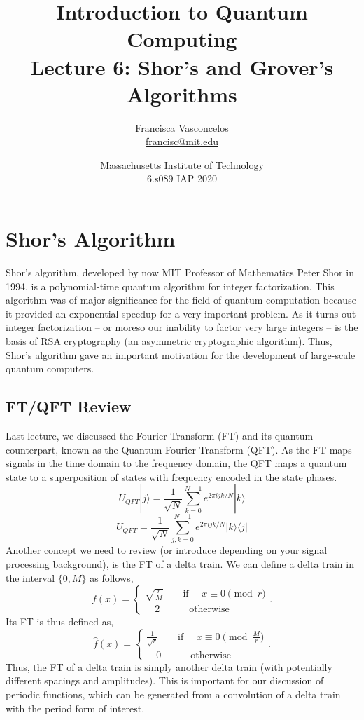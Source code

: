 \documentclass[11pt]{article} %
\author{Francisca Vasconcelos\\\href{mailto:francisc@mit.edu} {francisc@mit.edu}}
\title{Introduction to Quantum Computing\\Lecture 6: Shor's and Grover's Algorithms}
\date{Massachusetts Institute of Technology\\6.s089 IAP 2020}
\begin{document}
\maketitle
\newpage
\tableofcontents
\newpage

\section{Shor's Algorithm}
Shor's algorithm, developed by now MIT Professor of Mathematics Peter Shor in 1994, is a polynomial-time quantum algorithm for integer factorization. This algorithm was of major significance for the field of quantum computation because it provided an exponential speedup for a very important problem. As it turns out integer factorization -- or moreso our inability to factor very large integers -- is the basis of RSA cryptography (an asymmetric cryptographic algorithm). Thus, Shor's algorithm gave an important motivation for the development of large-scale quantum computers.
\subsection{FT/QFT Review}
Last lecture, we discussed the Fourier Transform (FT) and its quantum counterpart, known as the Quantum Fourier Transform (QFT). As the FT maps signals in the time domain to the frequency domain, the QFT maps a quantum state to a superposition of states with frequency encoded in the state phases. 
\begin{equation*}
    U_{QFT}|j\rangle=\frac{1}{\sqrt{N}}\sum_{k=0}^{N-1}e^{2\pi ijk/N}|k\rangle
\end{equation*}
\begin{equation*}
    U_{QFT}=\frac{1}{\sqrt{N}}\sum_{j,k=0}^{N-1}e^{2\pi ijk/N}|k\rangle\langle j|
\end{equation*}
\newline
\newline
Another concept we need to review (or introduce depending on your signal processing background), is the FT of a delta train. We can define a delta train in the interval $\{0,M\}$ as follows,
\begin{equation*}
    f(x)=
    \begin{cases}
        \sqrt{\frac{r}{M}} \qquad \text{if } \quad x\equiv0 \pmod r \\
        \quad 2 \qquad\quad \text{otherwise}
    \end{cases}.
\end{equation*}
Its FT is thus defined as,
\begin{equation*}
    \hat{f}(x)=
    \begin{cases}
        \frac{1}{\sqrt{r}} \qquad \text{if } \quad x\equiv0 \pmod{\frac{M}{r}} \\
        \quad 0 \qquad\quad \text{otherwise}
    \end{cases}.
\end{equation*}
Thus, the FT of a delta train is simply another delta train (with potentially different spacings and amplitudes). This is important for our discussion of periodic functions, which can be generated from a convolution of a delta train with the period form of interest.
\end{document}
